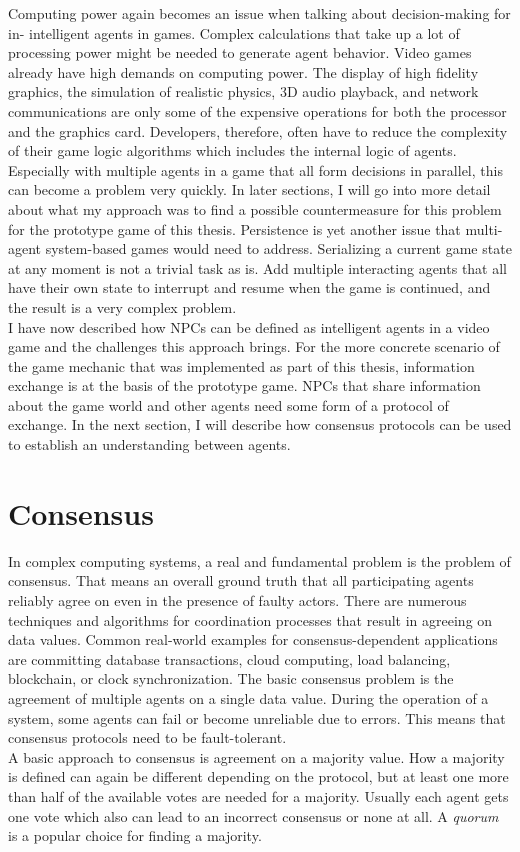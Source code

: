 Computing power again becomes an issue when talking about decision-making for in- intelligent agents in games. Complex calculations that take up a lot of processing power might be needed to generate agent behavior. Video games already have high demands on computing power. The display of high fidelity graphics, the simulation of realistic physics, 3D audio playback, and network communications are only some of the expensive operations for both the processor and the graphics card. Developers, therefore, often have to reduce the complexity of their game logic algorithms which includes the internal logic of agents. Especially with multiple agents in a game that all form decisions in parallel, this can become a problem very quickly. In later sections, I will go into more detail about what my approach was to find a possible countermeasure for this problem for the prototype game of this thesis. Persistence is yet another issue that multi-agent system-based games would need to address. Serializing a current game state at any moment is not a trivial task as is. Add multiple interacting agents that all have their own state to interrupt and resume when the game is continued, and the result is a very complex problem.~\cite{Dignum2009}\\
I have now described how NPCs can be defined as intelligent agents in a video game and the challenges this approach brings. For the more concrete scenario of the game mechanic that was implemented as part of this thesis, information exchange is at the basis of the prototype game. NPCs that share information about the game world and other agents need some form of a protocol of exchange. In the next section, I will describe how consensus protocols can be used to establish an understanding between agents.
\section{Consensus}
In complex computing systems, a real and fundamental problem is the problem of consensus. That means an overall ground truth that all participating agents reliably agree on even in the presence of faulty actors. There are numerous techniques and algorithms for coordination processes that result in agreeing on data values. Common real-world examples for consensus-dependent applications are committing database transactions, cloud computing, load balancing, blockchain, or clock synchronization. The basic consensus problem is the agreement of multiple agents on a single data value. During the operation of a system, some agents can fail or become unreliable due to errors. This means that consensus protocols need to be fault-tolerant.~\cite{Van2002}\\
A basic approach to consensus is agreement on a majority value. How a majority is defined can again be different depending on the protocol, but at least one more than half of the available votes are needed for a majority. Usually each agent gets one vote which also can lead to an incorrect consensus or none at all. A \textit{quorum} is a popular choice for finding a majority.
